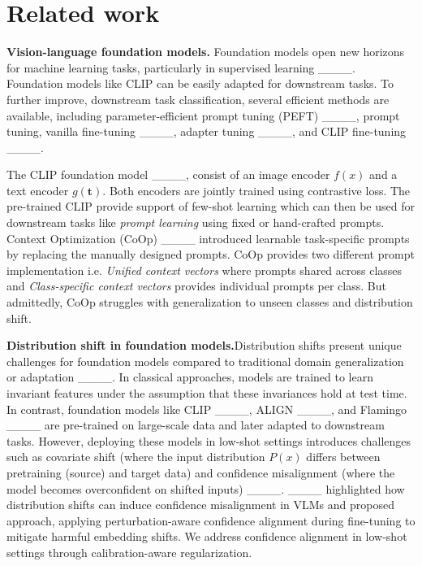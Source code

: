 \section{Related work}
\textbf{Vision-language foundation models.} Foundation models open new horizons for machine learning tasks, particularly in supervised learning ____. Foundation models like CLIP can be easily adapted for downstream tasks. To further improve, downstream task classification, several efficient methods are available, including parameter-efficient prompt tuning (PEFT) ____, prompt tuning, vanilla fine-tuning ____, adapter tuning ____, and CLIP fine-tuning ____. 

The CLIP foundation model  ____, consist of an image encoder \(f(x)\) and a text encoder \(g(\textbf{t})\). Both encoders are jointly trained using contrastive loss. The pre-trained CLIP provide support of few-shot learning which can then be used for downstream tasks like \textit{prompt learning} using fixed or hand-crafted prompts.
Context Optimization (CoOp) ____ introduced learnable task-specific prompts by replacing the manually designed prompts. CoOp provides two different prompt implementation i.e. \textit{Unified context vectors} where prompts shared across classes and \textit{Class-specific context vectors} provides individual prompts per class. But admittedly,  CoOp struggles with generalization to unseen classes and distribution shift.



\noindent
\textbf{Distribution shift in  foundation models.}Distribution shifts present unique challenges for foundation models compared to traditional domain generalization or adaptation ____. In classical approaches, models are trained to learn invariant features under the assumption that these invariances hold at test time. In contrast, foundation models like CLIP ____, ALIGN ____, and Flamingo ____ are pre-trained on large-scale data and later adapted to downstream tasks. However, deploying these models in low-shot settings introduces challenges such as covariate shift (where the input distribution \(P(x)\) differs between pretraining (source) and target data) and confidence misalignment (where the model becomes overconfident on shifted inputs) ____. ____ highlighted how distribution shifts can induce confidence misalignment in VLMs and proposed  approach, applying perturbation-aware confidence alignment during fine-tuning to mitigate harmful embedding shifts. We address confidence alignment in low-shot settings through calibration-aware regularization.



